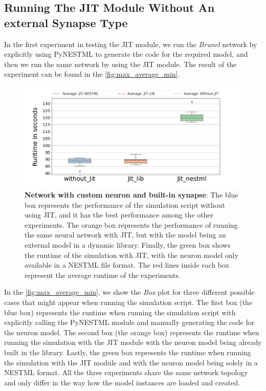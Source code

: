\subsection*{Running The JIT Module Without An external Synapse Type}

In the first experiment in testing the JIT module, we run the \emph{Brunel} network by explicitly using PyNESTML to generate the code for the required model, and then we run the same network by using the JIT module. The result of the experiment can be found in the \autoref{fig:max_average_min}.

\begin{figure}[ht!]
    \centering
    \includegraphics[width=\textwidth]{src/pic/box_plot_three.png}
    \caption{\textbf{Network with custom neuron and built-in synapse}: The blue box represents the performance of the simulation script without using JIT, and it has the best performance among the other experiments. The orange box represents the performance of running the same neural network with JIT, but with the model being an external model in a dynamic library. Finally, the green box shows the runtime of the simulation with JIT, with the neuron model only available in a NESTML file format. The red lines inside each box represent the average runtime of the experiments.}
    \label{fig:max_average_min}
\end{figure}

In the \autoref{fig:max_average_min}, we show the \emph{Box} plot for three different possible cases that might appear when running the simulation script. The first box (the blue box) represents the runtime when running the simulation script with explicitly calling the PyNESTML module and manually generating the code for the neuron model. The second box (the orange box) represents the runtime when running the simulation with the JIT module with the neuron model being already built in the library. Lastly, the green box represents the runtime when running the simulation with the JIT module and with the neuron model being solely in a NESTML format. All the three experiments share the same network topology and only differ in the way how the model instances are loaded and created.

